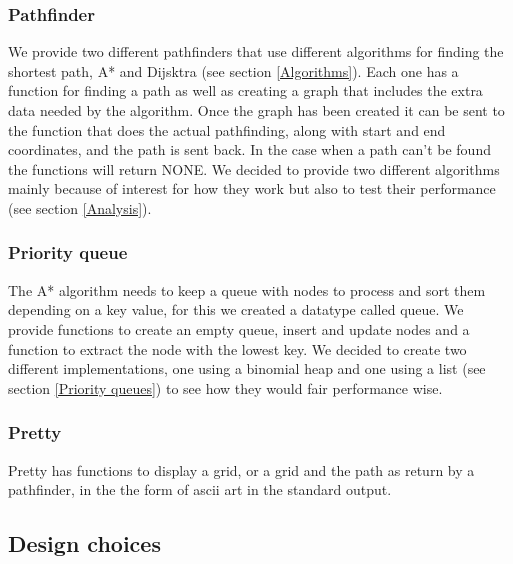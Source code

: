 \documentclass[12pt, a4paper]{article}
\begin{document}
\subsubsection{Pathfinder}
We provide two different pathfinders that use different algorithms for finding the shortest path, A* and Dijsktra (see section \ref{Algorithms}). Each one has a function for finding a path as well as creating a graph that includes the extra data needed by the algorithm. Once the graph has been created it can be sent to the function that does the actual pathfinding, along with start and end coordinates, and the path is sent back. In the case when a path can't be found the functions will return NONE. We decided to provide two different algorithms mainly because of interest for how they work but also to test their performance (see section \ref{Analysis}).

\subsubsection{Priority queue}
The A* algorithm needs to keep a queue with nodes to process and sort them depending on a key value, for this we created a datatype called queue. We provide functions to create an empty queue, insert and update nodes and a function to extract the node with the lowest key. We decided to create two different implementations, one using a binomial heap and one using a list (see section \ref{Priority queues}) to see how they would fair performance wise. 

\subsubsection{Pretty}
Pretty has functions to display a grid, or a grid and the path as return by a pathfinder, in the the form of ascii art in the standard output.






\subsection{Design choices}
\end{document}
